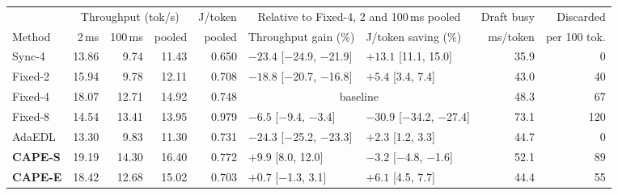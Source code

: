 \begin{tabular}{@{}lrrrrllrr@{}}
\toprule
 & \multicolumn{3}{c}{Throughput (tok/s)} & J/token & \multicolumn{2}{c}{Relative to Fixed-4, 2 and 100\,ms pooled} & Draft busy & Discarded\\
\cmidrule(lr){2-4}\cmidrule(lr){6-7}
Method & 2\,ms & 100\,ms & pooled & pooled & Throughput gain (\%) & J/token saving (\%) & ms/token & per 100 tok.\\
\midrule
Sync-4 & 13.86 & 9.74 & 11.43 & 0.650 & $-23.4$ [$-$24.9, $-$21.9] & $+13.1$ [11.1, 15.0] & 35.9 & 0 \\
Fixed-2 & 15.94 & 9.78 & 12.11 & 0.708 & $-18.8$ [$-$20.7, $-$16.8] & $+5.4$ [3.4, 7.4] & 43.0 & 40 \\
Fixed-4 & 18.07 & 12.71 & 14.92 & 0.748 & \multicolumn{2}{c}{baseline} & 48.3 & 67 \\
Fixed-8 & 14.54 & 13.41 & 13.95 & 0.979 & $-6.5$ [$-$9.4, $-$3.4] & $-30.9$ [$-$34.2, $-$27.4] & 73.1 & 120 \\
AdaEDL & 13.30 & 9.83 & 11.30 & 0.731 & $-24.3$ [$-$25.2, $-$23.3] & $+2.3$ [1.2, 3.3] & 44.7 & 0 \\
\textbf{CAPE-S} & 19.19 & 14.30 & 16.40 & 0.772 & $+9.9$ [8.0, 12.0] & $-3.2$ [$-$4.8, $-$1.6] & 52.1 & 89 \\
\textbf{CAPE-E} & 18.42 & 12.68 & 15.02 & 0.703 & $+0.7$ [$-$1.3, 3.1] & $+6.1$ [4.5, 7.7] & 44.4 & 55 \\
\bottomrule
\end{tabular}

